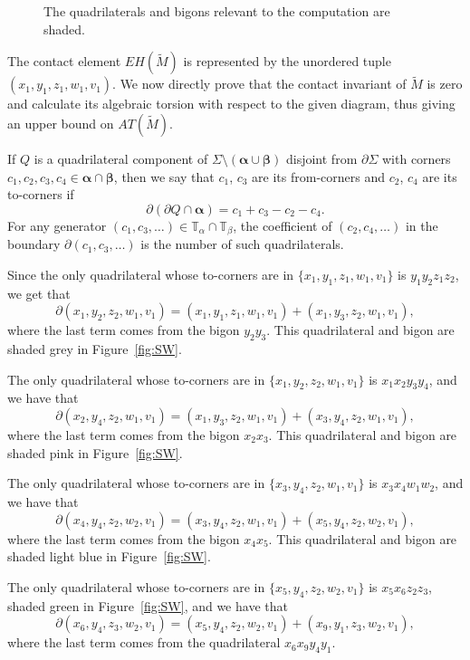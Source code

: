 \documentclass[11pt,oneside,english]{amsart}
\numberwithin{equation}{section}
\numberwithin{figure}{section}
\theoremstyle{definition}
\theoremstyle{plain}
\theoremstyle{plain}
\theoremstyle{remark}
\theoremstyle{plain}
\begin{document}
\begin{figure}
\caption{The quadrilaterals and bigons relevant to the computation are shaded.}
\label{fig:color}
\end{figure}

The contact element ${\mathit{EH}}(\widetilde{M})$ is represented by the
unordered tuple $(x_{1},y_{1},z_{1},w_{1}, v_1)$. We now directly prove
that the contact invariant of $\widetilde{M}$ is zero and calculate
its algebraic torsion with respect to the given diagram, thus giving
an upper bound on ${\mathit{AT}}(\widetilde{M})$.

If $Q$ is a quadrilateral component of ${\Sigma} \setminus ({\boldsymbol{\alpha}} \cup {\boldsymbol{\beta}})$ disjoint from $\partial {\Sigma}$
with corners $c_1,c_2,c_3,c_4 \in {\boldsymbol{\alpha}} \cap {\boldsymbol{\beta}}$,
then we say that $c_{1}$, $c_{3}$ are its from-corners and $c_{2}$, $c_{4}$
are its to-corners if
\[
\partial(\partial Q \cap {\boldsymbol{\alpha}}) = c_1 + c_3 - c_2 - c_4.
\]
For any generator $(c_1,c_3,\dots) \in {\mathbb{T}}_{\alpha} \cap {\mathbb{T}}_{\beta}$,
the coefficient of $(c_{2},c_{4},\dots)$ in the boundary $\partial(c_{1},c_{3},\dots)$
is the number of such quadrilaterals.

Since the only quadrilateral whose to-corners
are in $\{x_{1},y_{1},z_{1},w_{1},v_1\}$ is $y_{1}y_{2}z_{1}z_{2}$,
we get that
\[
\partial(x_{1},y_{2},z_{2},w_{1},v_1)=(x_{1},y_{1},z_{1},w_{1},v_1)+(x_{1},y_{3},z_{2},w_{1},v_1),
\]
where the last term comes from the bigon $y_{2}y_{3}$. This quadrilateral and bigon are  shaded
grey in Figure~\ref{fig:SW}.

The only quadrilateral whose to-corners are in $\{x_{1},y_{2},z_{2},w_{1},v_1\}$
is $x_{1}x_{2}y_{3}y_{4}$, and we have that
\[
\partial(x_{2},y_{4},z_{2},w_{1},v_1)=(x_{1},y_{3},z_{2},w_{1},v_1)+(x_{3},y_{4},z_{2},w_{1},v_1),
\]
where the last term comes from the bigon $x_{2}x_{3}$.
This quadrilateral and bigon are  shaded pink in Figure~\ref{fig:SW}.

The only quadrilateral whose to-corners are in $\{x_{3},y_{4},z_{2},w_{1},v_1\}$
is $x_{3}x_{4}w_{1}w_{2}$, and we have that
\[
\partial(x_{4},y_{4},z_{2},w_{2},v_1)=(x_{3},y_{4},z_{2},w_{1},v_1)+(x_{5},y_{4},z_{2},w_{2},v_1),
\]
where the last term comes from the bigon $x_{4}x_{5}$.
This quadrilateral and bigon are shaded light blue in Figure~\ref{fig:SW}.

The only quadrilateral whose to-corners are in $\{x_{5},y_{4},z_{2},w_{2},v_1\}$
is $x_{5}x_{6}z_{2}z_{3}$, shaded green in Figure~\ref{fig:SW}, and we have that
\[
\partial(x_{6},y_{4},z_{3},w_{2},v_1)=(x_{5},y_{4},z_{2},w_{2},v_1)+(x_9,y_1,z_3,w_2,v_1),
\]
where the last term comes from the quadrilateral $x_6x_9y_4y_1$.
\end{document}
